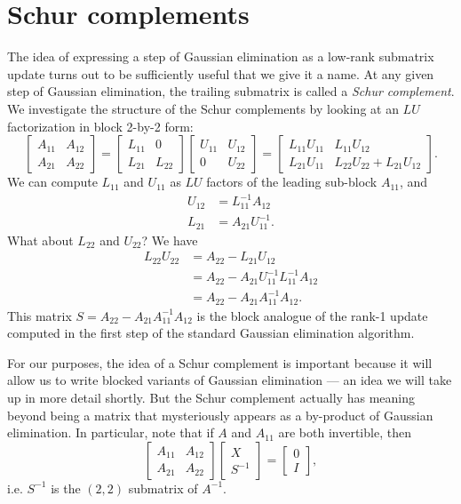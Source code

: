 \documentclass[12pt, leqno]{article} %
\begin{document}
\section{Schur complements}

The idea of expressing a step of Gaussian elimination as a low-rank
submatrix update turns out to be sufficiently useful that we give it
a name.  At any given step of Gaussian elimination, the trailing
submatrix is called a {\em Schur complement}.  We investigate the
structure of the Schur complements by looking at an $LU$
factorization in block 2-by-2 form:
\[
  \begin{bmatrix}
    A_{11} & A_{12} \\
    A_{21} & A_{22}
  \end{bmatrix} =
  \begin{bmatrix}
    L_{11} & 0 \\
    L_{21} & L_{22}
  \end{bmatrix}
  \begin{bmatrix}
    U_{11} & U_{12} \\
        0 & U_{22}
  \end{bmatrix} =
  \begin{bmatrix}
    L_{11} U_{11} & L_{11} U_{12} \\
    L_{21} U_{11} & L_{22} U_{22} + L_{21} U_{12}
  \end{bmatrix}.
\]
We can compute $L_{11}$ and $U_{11}$ as $LU$ factors of the leading
sub-block $A_{11}$, and
\begin{align*}
  U_{12} &= L_{11}^{-1} A_{12} \\
  L_{21} &= A_{21} U_{11}^{-1}.
\end{align*}
What about $L_{22}$ and $U_{22}$?  We have
\begin{align*}
  L_{22} U_{22}
  &= A_{22} - L_{21} U_{12} \\
  &= A_{22} - A_{21} U_{11}^{-1} L_{11}^{-1} A_{12} \\
  &= A_{22} - A_{21} A_{11}^{-1} A_{12}.
\end{align*}
This matrix $S = A_{22} - A_{21} A_{11}^{-1} A_{12}$ is the block analogue
of the rank-1 update computed in the first step of the standard
Gaussian elimination algorithm.

For our purposes, the idea of a Schur complement is important because
it will allow us to write blocked variants of Gaussian elimination ---
an idea we will take up in more detail shortly.
But the Schur complement actually has meaning beyond being a matrix that
mysteriously appears as a by-product of Gaussian elimination.
In particular, note that if $A$ and $A_{11}$ are both invertible,
then
\[
  \begin{bmatrix} A_{11} & A_{12} \\ A_{21} & A_{22} \end{bmatrix}
  \begin{bmatrix} X \\ S^{-1} \end{bmatrix} =
  \begin{bmatrix} 0 \\ I \end{bmatrix},
\]
i.e. $S^{-1}$ is the $(2,2)$ submatrix of $A^{-1}$.
\end{document}
